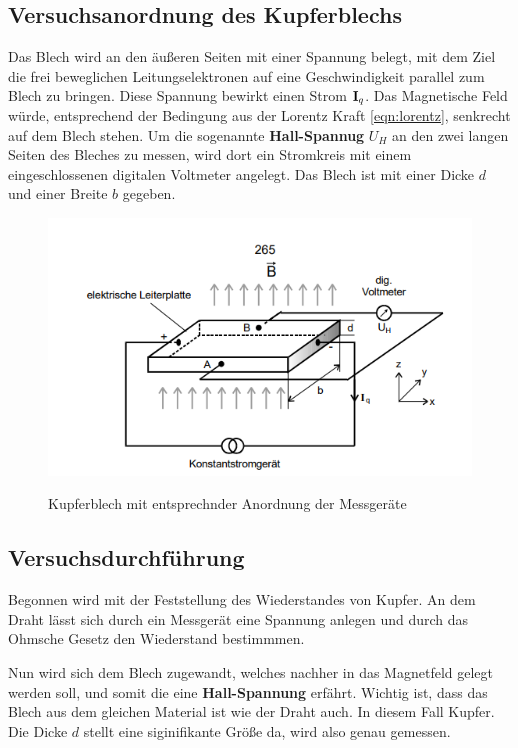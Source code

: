 \subsection{Versuchsanordnung des Kupferblechs}
\label{sec:Blech}
Das Blech wird an den äußeren Seiten mit einer Spannung belegt, mit dem Ziel die frei beweglichen Leitungselektronen auf eine Geschwindigkeit parallel zum 
Blech zu bringen. Diese Spannung bewirkt einen Strom $\text{\textbf{I}}_q$. Das Magnetische Feld würde, entsprechend der Bedingung aus der Lorentz Kraft \eqref{eqn:lorentz},
senkrecht auf dem Blech stehen. Um die sogenannte \textbf{Hall-Spannug} $U_H$ an den zwei langen Seiten des Bleches zu messen, wird dort ein Stromkreis
mit einem eingeschlossenen digitalen Voltmeter angelegt. Das Blech ist mit einer Dicke $d$ und einer Breite $b$ gegeben.

\begin{figure}
     \centering
     \includegraphics[width=\textwidth]{bilder/versuchsanordnung.png}
     \caption{Kupferblech mit entsprechnder Anordnung der Messgeräte}
     \cite[9]{V311.pdf}
     \label{fig:kupferblech}
\end{figure}

\subsection{Versuchsdurchführung}
Begonnen wird mit der Feststellung des Wiederstandes von Kupfer. An dem Draht lässt sich durch ein Messgerät eine Spannung anlegen und durch das Ohmsche Gesetz
den Wiederstand bestimmmen. \\ \flushleft

Nun wird sich dem Blech zugewandt, welches nachher in das Magnetfeld gelegt werden soll, und somit die eine \textbf{Hall-Spannung} erfährt.
Wichtig ist, dass das Blech aus dem gleichen Material ist wie der Draht auch. In diesem Fall Kupfer. Die Dicke $d$ stellt eine siginifikante Größe da, wird also genau gemessen.\\ \flushleft


